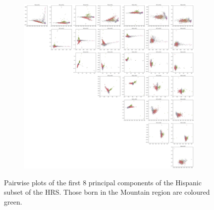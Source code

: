 \documentclass[12pt]{pnas-new}
\begin{document}
\begin{figure}
    \centering
    \begin{subfigure}{\textwidth}
    \includegraphics[width=\textwidth]{images/HRS_PCGRID_8.pdf}
    \end{subfigure}
    \caption{Pairwise plots of the first 8 principal components of the Hispanic subset of the HRS. Those born in the Mountain region are coloured green.}
    \label{fig:supp_hrs_hisp_grid}
\end{figure}
\end{document}
